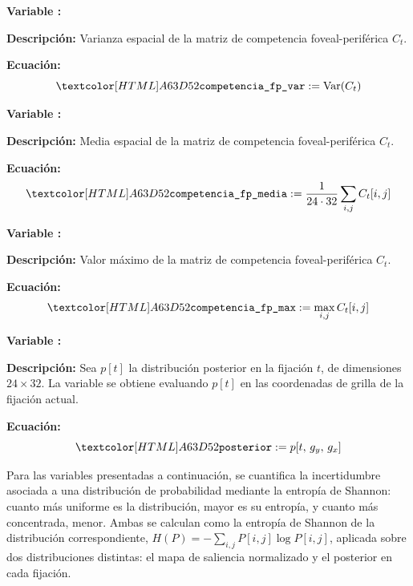\begin{featuredef}
\textbf{Variable \thetcbcounter:} 

\textbf{Descripción:} Varianza espacial de la matriz de competencia
foveal-periférica $C_t$.

\textbf{Ecuación:}
\begin{equation}
    \feat{competencia\_fp\_var} := \text{Var}(C_t)
\end{equation}
\end{featuredef}

\begin{featuredef}
\textbf{Variable \thetcbcounter:} 

\textbf{Descripción:} Media espacial de la matriz de competencia
foveal-periférica $C_t$.

\textbf{Ecuación:}
\begin{equation}
    \feat{competencia\_fp\_media} := \frac{1}{24 \cdot 32}
    \sum_{i,j} C_t[i, j]
\end{equation}
\end{featuredef}

\begin{featuredef}
\textbf{Variable \thetcbcounter:} 

\textbf{Descripción:} Valor máximo de la matriz de competencia
foveal-periférica $C_t$.

\textbf{Ecuación:}
\begin{equation}
    \feat{competencia\_fp\_max} := \max_{i,j} C_t[i, j]
\end{equation}
\end{featuredef}

\begin{featuredef}
\textbf{Variable \thetcbcounter:} 

\textbf{Descripción:} Sea $p[t]$ la distribución posterior en la fijación
$t$, de dimensiones $24 \times 32$. La variable se obtiene evaluando $p[t]$ en las
coordenadas de grilla de la fijación actual.

\textbf{Ecuación:}
\begin{equation}
    \feat{posterior} := p[t,\, g_y,\, g_x]
\end{equation}
\end{featuredef}

Para las variables presentadas a continuación, se
cuantifica la incertidumbre asociada a una distribución de probabilidad
mediante la entropía de Shannon: cuanto más uniforme es la distribución,
mayor es su entropía, y cuanto más concentrada, menor. Ambas se calculan como la entropía
de Shannon de la distribución correspondiente,
$H(P) = -\sum_{i,j} P[i,j] \log P[i,j]$, aplicada sobre dos distribuciones
distintas: el mapa de saliencia normalizado y el posterior en cada fijación.

